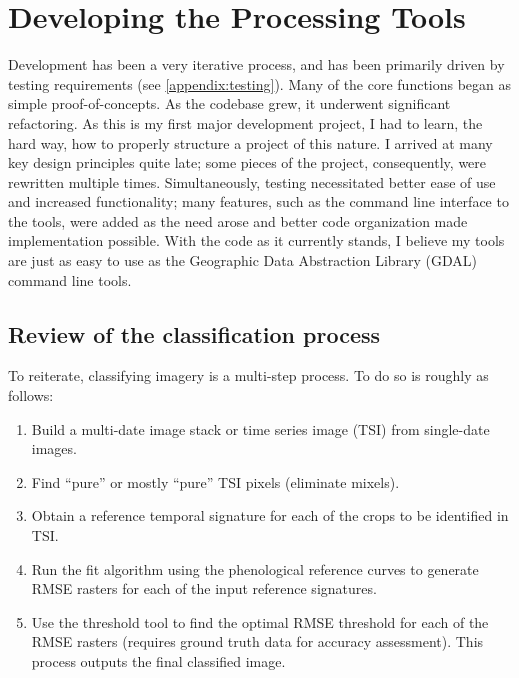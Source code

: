 \chapter{Developing the Processing Tools}
\label{appendix:tools}

Development has been a very iterative process, and has been primarily driven by testing requirements (see \autoref{appendix:testing}). Many of the core functions began as simple proof-of-concepts. As the codebase grew, it underwent significant refactoring. As this is my first major development project, I had to learn, the hard way, how to properly structure a project of this nature. I arrived at many key design principles quite late; some pieces of the project, consequently, were rewritten multiple times. Simultaneously, testing necessitated better ease of use and increased functionality; many features, such as the command line interface to the tools, were added as the need arose and better code organization made implementation possible. With the code as it currently stands, I believe my tools are just as easy to use as the Geographic Data Abstraction Library (GDAL) command line tools.

\section{Review of the classification process}

To reiterate, classifying imagery is a multi-step process. To do so is roughly as follows:

\begin{Spacing}{1.2}
\begin{enumerate}
  \item Build a multi-date image stack or time series image (TSI) from single-date images.
  \item Find ``pure'' or mostly ``pure'' TSI pixels (eliminate mixels).
  \item Obtain a reference temporal signature for each of the crops to be identified in TSI.
  \item Run the fit algorithm using the phenological reference curves to generate RMSE rasters for each of the input reference signatures.
  \item Use the threshold tool to find the optimal RMSE threshold for each of the RMSE rasters (requires ground truth data for accuracy assessment). This process outputs the final classified image.
\end{enumerate}
\end{Spacing}

